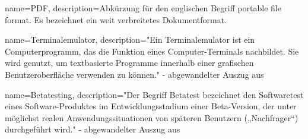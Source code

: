 {
    name=PDF,
    description={Abkürzung für den englischen Begriff portable file format. Es
            bezeichnet ein weit verbreitetes Dokumentformat.}
}

{
    name=Terminalemulator,
    description={"Ein Terminalemulator ist ein Computerprogramm, das die Funktion
            eines Computer-Terminals nachbildet. Sie wird genutzt, um textbasierte Programme
            innerhalb einer grafischen Benutzeroberfläche verwenden zu können." -
            abgewandelter Auszug aus \cite{terminal-emulator}}
}

{
    name=Betatesting,
    description={"Der Begriff Betatest bezeichnet den Softwaretest eines Software-Produktes
            im Entwicklungsstadium einer Beta-Version, der unter möglichst realen Anwendungssituationen
            von späteren Benutzern („Nachfrager“) durchgeführt wird." -
            abgewandelter Auszug aus \cite{beta-testing}}
}

\glsaddall